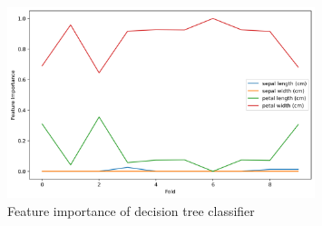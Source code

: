 \documentclass[12pt,a4paper]{article}
\begin{document}
\begin{figure}[h]
    \centering
    \includegraphics[width=0.8\textwidth]{figures/iris_feature_importance_for_each_fold.png}
    \caption{Feature importance of decision tree classifier}
    \label{fig:feature_importance}
\end{figure}
\end{document}
